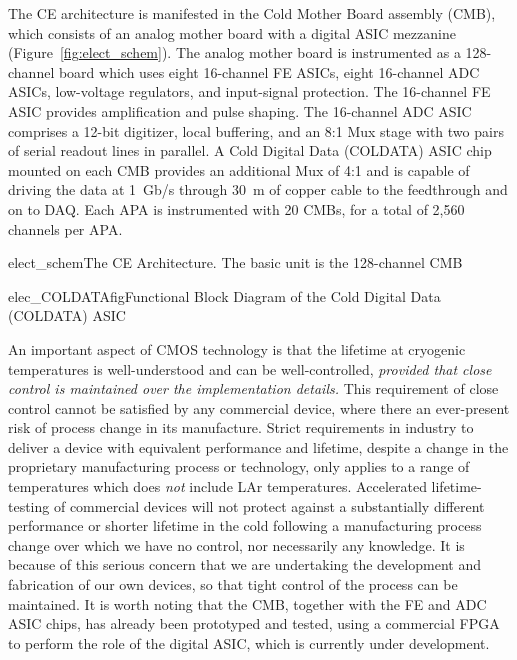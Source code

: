 The CE architecture is manifested in the Cold Mother Board assembly (CMB),
which consists of an analog mother board with a digital ASIC mezzanine (Figure~\ref{fig:elect_schem}).
The analog mother board is instrumented as a 128-channel board which uses eight 16-channel FE ASICs,
eight 16-channel ADC ASICs, low-voltage regulators, and input-signal protection.
The 16-channel FE ASIC provides amplification and pulse shaping.
The 16-channel ADC ASIC comprises a 12-bit digitizer, local buffering,
and an 8:1 Mux stage with two pairs of serial readout lines in parallel.
A Cold Digital Data (COLDATA) ASIC chip mounted on each CMB provides an additional Mux of 4:1 and
is capable of driving the data at 1~Gb/s through 30~m of copper cable to the feedthrough and on to DAQ. 
Each APA is instrumented with 20 CMBs, for a total of 2,560 channels per APA.
\begin{cdrfigure}{elect_schem}{The CE Architecture. The basic unit is the 128-channel CMB}
\end{cdrfigure}
\begin{cdrfigure}{elec_COLDATAfig}{Functional Block Diagram of the Cold Digital Data (COLDATA) ASIC}
\end{cdrfigure}

An important aspect of CMOS technology is that the lifetime at cryogenic temperatures is well-understood and can be
well-controlled, {\em provided that close control is maintained over the implementation details.}
This requirement of close control cannot be satisfied by any commercial device,
where there an ever-present risk of process change in its manufacture.
Strict requirements in industry to deliver a device with equivalent performance and lifetime,
despite a change in the proprietary manufacturing process or technology,
only applies to a range of temperatures which does {\em not} include LAr temperatures.
Accelerated lifetime-testing of commercial devices will not protect against 
a substantially different performance or shorter lifetime in the cold following a manufacturing process change
over which we have no control, nor necessarily any knowledge.
It is because of this serious concern that we are undertaking the development and fabrication of our own devices, 
so that tight control of the process can be maintained.
It is worth noting that the CMB, together with the FE and ADC ASIC chips, has already been prototyped and tested,
using a commercial FPGA to perform the role of the digital ASIC,
which is currently under development.

